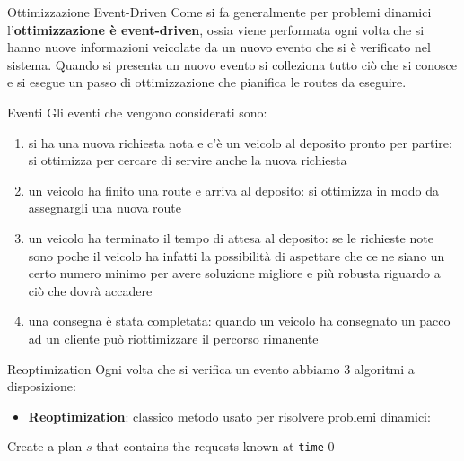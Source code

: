 \documentclass[10pt]{beamer}
\begin{document}
    \begin{frame}{Ottimizzazione Event-Driven}
         Come si fa generalmente per problemi dinamici l'\textbf{ottimizzazione è event-driven}, ossia viene performata ogni volta che si hanno nuove informazioni veicolate da un nuovo evento che si è verificato nel sistema. Quando si presenta un nuovo evento si colleziona tutto ciò che si conosce e si esegue un passo di ottimizzazione che pianifica le routes da eseguire.
    \end{frame}

    \begin{frame}{Eventi}
        Gli eventi che vengono considerati sono:

        \begin{enumerate}
            \label{events}
            \item si ha una nuova richiesta nota e c'è un veicolo al deposito pronto per partire: si ottimizza per cercare di servire anche la nuova richiesta
            \item un veicolo ha finito una route e arriva al deposito: si ottimizza in modo da assegnargli una nuova route
            \item un veicolo ha terminato il tempo di attesa al deposito: se le richieste note sono poche il veicolo ha infatti la possibilità di aspettare che ce ne siano un certo numero minimo per avere soluzione migliore e più robusta riguardo a ciò che dovrà accadere
            \item una consegna è stata completata: quando un veicolo ha consegnato un pacco ad un cliente può riottimizzare il percorso rimanente
        \end{enumerate}
    \end{frame}

    \begin{frame}{Reoptimization}
        Ogni volta che si verifica un evento abbiamo 3 algoritmi a disposizione:

        \begin{itemize}
            \item \textbf{Reoptimization}: classico metodo usato per risolvere problemi dinamici: 
        \end{itemize}
        \begin{algorithm}[H]
            \SetAlgoLined
            Create a plan $s$ that contains the requests known at \texttt{time} $0$\;
            \caption{Reoptimization}
            \label{alg:Reoptimization}
        \end{algorithm}
    \end{frame}
\end{document}
